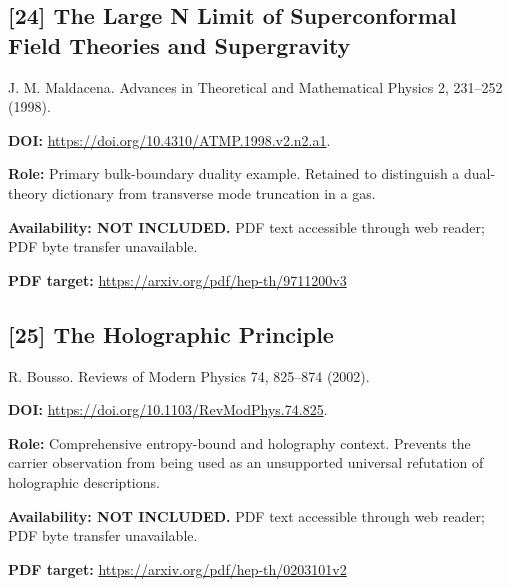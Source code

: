 \documentclass[11pt,a4paper]{article}
\begin{document}
\par\medskip
\begin{minipage}{\textwidth}
\subsection*{[24] The Large N Limit of Superconformal Field Theories and Supergravity}
J. M. Maldacena. Advances in Theoretical and Mathematical Physics 2, 231--252 (1998).

\textbf{DOI:} \url{https://doi.org/10.4310/ATMP.1998.v2.n2.a1}.

\textbf{Role:} Primary bulk-boundary duality example. Retained to distinguish a dual-theory dictionary from transverse mode truncation in a gas.

\textbf{Availability: NOT INCLUDED.} PDF text accessible through web reader; PDF byte transfer unavailable.\par
\textbf{PDF target:} \url{https://arxiv.org/pdf/hep-th/9711200v3}
\end{minipage}
\par\medskip
\begin{minipage}{\textwidth}
\subsection*{[25] The Holographic Principle}
R. Bousso. Reviews of Modern Physics 74, 825--874 (2002).

\textbf{DOI:} \url{https://doi.org/10.1103/RevModPhys.74.825}.

\textbf{Role:} Comprehensive entropy-bound and holography context. Prevents the carrier observation from being used as an unsupported universal refutation of holographic descriptions.

\textbf{Availability: NOT INCLUDED.} PDF text accessible through web reader; PDF byte transfer unavailable.\par
\textbf{PDF target:} \url{https://arxiv.org/pdf/hep-th/0203101v2}
\end{minipage}
\par\medskip
\end{document}
